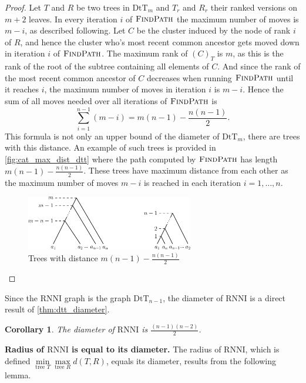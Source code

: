 \documentclass[11pt]{amsart}
\newtheorem{corollary}{Corollary}
\newcommand{\rnni}{\mathrm{RNNI}}
\newcommand{\findpath}{\textsc{FindPath}}
\newcommand{\dtt}{\mathrm{DtT}}
\newcommand{\summary}[1]{\textbf{#1}} %
\begin{document}
\begin{proof}
	Let $T$ and $R$ be two trees in $\dtt_m$ and $T_r$ and $R_r$ their ranked versions on $m+2$ leaves.
	In every iteration $i$ of $\findpath$ the maximum number of moves is $m-i$, as described following.
	Let $C$ be the cluster induced by the node of rank $i$ of $R$, and hence the cluster who's most recent common ancestor gets moved down in iteration $i$ of $\findpath$.
	The maximum rank of $(C)_T$ is $m$, as this is the rank of the root of the subtree containing all elements of $C$.
	And since the rank of the most recent common ancestor of $C$ decreases when running $\findpath$ until it reaches $i$, the maximum number of moves in iteration $i$ is $m-i$.
	Hence the sum of all moves needed over all iterations of $\findpath$ is
	\[\sum\limits_{i = 1}^{n-1} (m - i) = m(n-1) - \frac{n(n-1)}{2}.\]
	This formula is not only an upper bound of the diameter of $\dtt_m$, there are trees with this distance.
	An example of such trees is provided in \autoref{fig:cat_max_dist_dtt} where the path computed by $\findpath$ has length $m(n-1) - \frac{n(n-1)}{2}$.
	These trees have maximum distance from each other as the maximum number of moves $m-i$ is reached in each iteration $i = 1, \ldots, n$.
	\begin{figure}[ht]
		\includegraphics[width=0.65\textwidth]{cat_max_dist_dtt.eps}
		\caption{Trees with distance $m(n-1) - \frac{n(n-1)}{2}$}
		\label{fig:cat_max_dist_dtt}
	\end{figure}
\end{proof}

Since the $\rnni$ graph is the graph $\dtt_{n-1}$, the diameter of $\rnni$ is a direct result of \autoref{thm:dtt_diameter}.

\begin{corollary}
	The diameter of $\rnni$ is $\frac{(n-1)(n-2)}{2}$.
	\label{cor:diameter_rnni}
\end{corollary}

\summary{Radius of $\rnni$ is equal to its diameter.}
The radius of $\rnni$, which is defined $\min\limits_{\text{tree } T}\max\limits_{\text{tree }R} d(T,R)$, equals its diameter, results from the following lemma.
\end{document}
